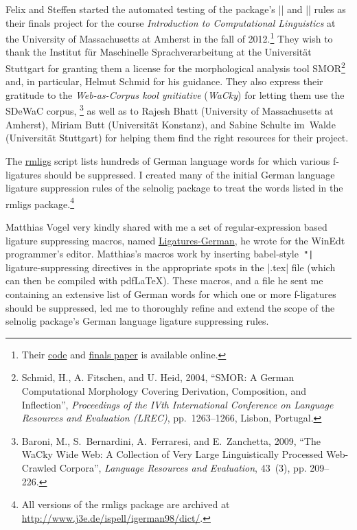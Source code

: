 \documentclass[11pt]{article}
\newcommand{\pkg}[1]{\textsf{#1}}
\begin{document}
Felix and Steffen started the automated testing of the package's |\nolig| and |\keeplig| rules as their finals project for the course \emph{Introduction to Computational Linguistics} at the University of Massachusetts at Amherst in the fall of 2012.\footnote{Their \href{https://github.com/SHildebrandt/selnolig-check}{code} and \href{https://github.com/SHildebrandt/selnolig-check/blob/master/selnolig-check-documentation.pdf?raw=true}{finals paper} is available online.} They wish to thank the Institut für Maschinelle Sprachverarbeitung at the Universität Stuttgart for granting them a license for the morphological analysis tool SMOR\footnote{Schmid, H., A. Fitschen, and U. Heid, 2004, \enquote{SMOR: A German Computational Morphology Covering Derivation, Composition, and Inflection}, \emph{Proceedings of the IVth International Conference on Language Resources and Evaluation (LREC)}, pp.~1263--1266, Lisbon, Portugal.} and, in particular, Helmut Schmid for his guidance. They also express their gratitude to the \emph{Web-as-Corpus kool ynitiative} (\emph{WaCky}) for letting them use the SDeWaC corpus,%
\footnote{Baroni, M., S.~Bernardini, A.~Ferraresi, and E.~Zanchetta, 2009, \enquote{The WaCky Wide Web: A Collection of Very Large Linguistically Processed Web-Crawled Corpora}, \emph{Language Resources and Evaluation}, 43~(3), pp. 209--226.} as well as to Rajesh Bhatt (University of Massachusetts at Amherst), Miriam Butt (Universität Konstanz), and Sabine Schulte im~Walde (Universität Stuttgart) for helping them find the right resources for their project.

The \href{http://www.ctan.org/tex-archive/support/rmligs}{\pkg{rmligs}} script lists hundreds of German language words for which various f\nobreak-liga\-tures should be suppressed. I created many of the initial German language ligature suppression rules of the \pkg{selnolig} package to treat the words listed in the \pkg{rmligs} package.\footnote{All versions of the \pkg{rmligs} package are archived at \url{http://www.j3e.de/ispell/igerman98/dict/}.} 

Matthias Vogel very kindly shared with me a set of regular-expression based ligature suppressing macros, named \href{http://www.winedt.org/Macros/LaTeX/Ligatures-German.php}{Ligatures-German}, he wrote for the WinEdt programmer's editor. Matthias's macros work by inserting \pkg{babel}-style~\Verb+"|+ ligature-suppressing  directives in the appropriate spots in the |.tex| file (which can then be compiled with pdf\LaTeX). These macros, and a file he sent me containing an extensive list of German words for which one or more f-ligatures should be suppressed, led me to thoroughly refine and extend the scope of the \pkg{selnolig} package's German language ligature suppressing rules.
\end{document}
